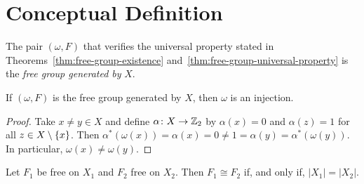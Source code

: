 \section{Conceptual Definition}

\begin{defn}
    The pair $(\omega, F)$ that verifies the universal property stated in Theorems~\ref{thm:free-group-existence} and~\ref{thm:free-group-universal-property} is the \textsl{free group generated by} $X$.
\end{defn}

\begin{prop}
    If\/ $(\omega,F)$ is the free group generated by\/ $X$, then\/ $\omega$ is an injection.
\end{prop}

\begin{proof}
    Take $x\ne y\in X$ and define $\alpha\colon X\to\mathbb{Z}_2$ by $\alpha(x)=0$ and $\alpha(z)=1$ for all $z\in X\setminus\{x\}$. Then $\alpha^*(\omega(x))=\alpha(x)=0\ne1=\alpha(y)=\alpha^*(\omega(y))$. In particular, $\omega(x)\ne\omega(y)$.
\end{proof}

\begin{thm}
    Let\/ $F_1$ be free on\/ $X_1$ and\/ $F_2$ free on\/ $X_2$. Then\/ $F_1 \cong F_2$ if, and only if, $|X_1| = |X_2|$.
\end{thm}

